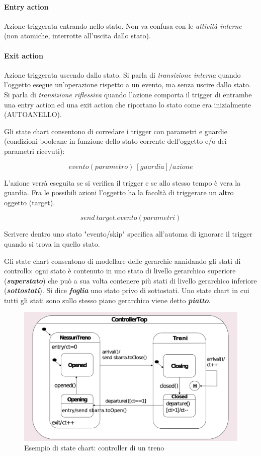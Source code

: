 \paragraph{Entry action} Azione triggerata entrando nello stato. Non va confusa con le \textit{attività interne} (non atomiche, interrotte all'uscita dallo stato).

\paragraph{Exit action} Azione triggerata uscendo dallo stato. Si parla di \textit{transizione interna} quando l'oggetto esegue un'operazione rispetto a un evento, ma senza uscire dallo stato. Si parla di \textit{transizione riflessiva} quando l'azione comporta il trigger di entrambe una entry action ed una exit action che riportano lo stato come era inizialmente (AUTOANELLO).

Gli state chart consentono di corredare i trigger con parametri e guardie (condizioni booleane in funzione dello stato corrente dell'oggetto e/o dei parametri ricevuti):

$$evento(parametro)\ [guardia]/azione$$

L'azione verrà eseguita se si verifica il trigger e se allo stesso tempo è vera la guardia. Fra le possibili azioni l'oggetto ha la facoltà di triggerare un altro oggetto (target).

$$send\ target.evento(parametri)$$

Scrivere dentro uno stato "evento/skip" specifica all'automa di ignorare il trigger quando si trova in quello stato.

Gli state chart consentono di modellare delle gerarchie annidando gli stati di controllo: ogni stato è contenuto in uno stato di livello gerarchico superiore (\textbf{\textit{superstato}}) che può a sua volta contenere più stati di livello gerarchico inferiore (\textbf{\textit{sottostati}}). Si dice \textbf{\textit{foglia}} uno stato privo di sottostati. Uno state chart in cui tutti gli stati sono sullo stesso piano gerarchico viene detto \textbf{\textit{piatto}}.

\begin{figure}[H]
    \centering
    \includegraphics[width=0.75\linewidth]{assets/UML/state/state4.png}
    \caption{Esempio di state chart: controller di un treno}
\end{figure}

